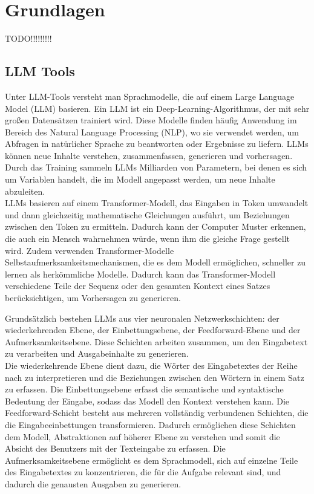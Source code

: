
\chapter{Grundlagen} 

TODO!!!!!!!!!

\section{LLM Tools}  \label{LLM Tools}

Unter LLM-Tools versteht man Sprachmodelle, die auf einem Large Language Model (LLM) basieren. Ein LLM ist ein 
Deep-Learning-Algorithmus, der mit sehr großen Datensätzen trainiert wird. Diese Modelle finden häufig Anwendung im 
Bereich des Natural Language Processing (NLP), wo sie verwendet werden, um Abfragen in natürlicher Sprache zu beantworten 
oder Ergebnisse zu liefern. LLMs können neue Inhalte verstehen, zusammenfassen, generieren und vorhersagen. Durch das Training 
sammeln LLMs Milliarden von Parametern, bei denen es sich um Variablen handelt, die im Modell angepasst werden, um neue 
Inhalte abzuleiten.\\
LLMs basieren auf einem Transformer-Modell, das Eingaben in Token umwandelt und dann gleichzeitig mathematische 
Gleichungen ausführt, um Beziehungen zwischen den Token zu ermitteln. Dadurch kann der Computer Muster erkennen, 
die auch ein Mensch wahrnehmen würde, wenn ihm die gleiche Frage gestellt wird. Zudem verwenden Transformer-Modelle 
Selbstaufmerksamkeitsmechanismen, die es dem Modell ermöglichen, schneller zu lernen als herkömmliche Modelle. 
Dadurch kann das Transformer-Modell verschiedene Teile der Sequenz oder den gesamten Kontext eines Satzes berücksichtigen, 
um Vorhersagen zu generieren.

Grundsätzlich bestehen LLMs aus vier neuronalen Netzwerkschichten: der wiederkehrenden Ebene, der Einbettungsebene, 
der Feedforward-Ebene und der Aufmerksamkeitsebene. Diese Schichten arbeiten zusammen, um den Eingabetext zu verarbeiten 
und Ausgabeinhalte zu generieren.\\
Die wiederkehrende Ebene dient dazu, die Wörter des Eingabetextes der Reihe nach zu interpretieren und die Beziehungen 
zwischen den Wörtern in einem Satz zu erfassen. Die Einbettungsebene erfasst die semantische und syntaktische Bedeutung 
der Eingabe, sodass das Modell den Kontext verstehen kann. Die Feedforward-Schicht besteht aus mehreren vollständig 
verbundenen Schichten, die die Eingabeeinbettungen transformieren. Dadurch ermöglichen diese Schichten dem Modell, 
Abstraktionen auf höherer Ebene zu verstehen und somit die Absicht des Benutzers mit der Texteingabe zu erfassen. Die 
Aufmerksamkeitsebene ermöglicht es dem Sprachmodell, sich auf einzelne Teile des Eingabetextes zu konzentrieren, die für 
die Aufgabe relevant sind, und dadurch die genausten Ausgaben zu generieren.

